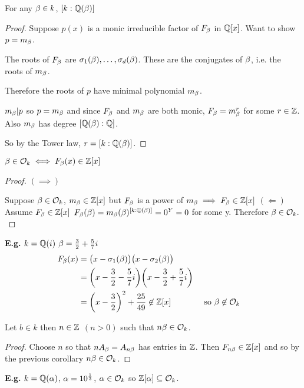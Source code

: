 \documentclass[11pt]{article}
\begin{document}
\begin{cor}
	For any $\beta \in k$, $[k : \mathbb{Q}(\beta)]$
\end{cor}
\begin{proof}
	Suppose $p(x)$ is a monic irreducible factor of $F_\beta$ in $\mathbb{Q}[x]$.
	Want to show $p=m_\beta$.
	\spa

	The roots of $F_\beta$ are $\sigma_1(\beta), \dots, \sigma_d(\beta)$.
	These are the conjugates of $\beta$, i.e. the roots of $m_\beta$.
	\spa

	Therefore the roots of $p$ have minimal polynomial $m_\beta$.
	\spa

	$m_\beta | p$ so $p = m_\beta$ and since $F_\beta $ and $m_\beta$ are both monic, $F_\beta = m_\beta^r$ for some $r \in \mathbb{Z}$.
	Also $m_\beta$ has degree $[\mathbb{Q}(\beta) : \mathbb{Q}]$.
\spa

	So by the Tower law, $r = [k: \mathbb{Q}(\beta)]$.
\end{proof}
\begin{cor}
	$\beta \in \mathcal{O}_{k} \iff F_\beta(x) \in \mathbb{Z}[x]$
\end{cor}
\begin{proof}
	$(\implies)$
\spa

	Suppose $\beta \in \mathcal{O}_k $, $m_\beta \in \mathbb{Z}[x]$ but $F_\beta $ is a power of $m_\beta \implies F_\beta \in \mathbb{Z}[x]$
\spac
	$(\Longleftarrow)$
	Assume $F_\beta \in \mathbb{Z}[x] $ \hspace{7pt} $ F_\beta(\beta) = m_\beta(\beta)^{[k:\mathbb{Q}(\beta)]} = 0^{Y} = 0$ for some y.
	Therefore $\beta \in \mathcal{O}_k.$
	
\end{proof}

\textbf{E.g.} $k = \mathbb{Q}(i) $\hspace{7pt} $ \beta = \frac{3}{2} + \frac{5}{7}i$
\begin{align*}
	F_\beta(x) &= \big(x-\sigma_1(\beta)\big)\big(x-\sigma_2(\beta)\big)\\
	& = \bigg(x- \frac{3}{2} - \frac{5}{7} i\bigg)\bigg(x-\frac{3}{2} + \frac{5}{7}i\bigg)\\
	& = \bigg(x-\frac{3}{2}\bigg)^2 + \frac{25}{49} \not \in \mathbb{Z}[x] && \text{ so } \beta \not \in \mathcal{O}_k
\end{align*}

\begin{cor}
	Let $b \in k$ then $n \in \mathbb{Z}$ $(n > 0)$ such that $n \beta \in \mathcal{O}_k$.
\end{cor}

\begin{proof}
	Choose $n$ so that $nA_\beta = A_{n\beta}$ has entries in $\mathbb{Z}$. 
	Then $F_{n\beta} \in \mathbb{Z}[x]$ and so by the previous corollary $n\beta \in \mathcal{O}_k$. 
\end{proof}
\spa
\textbf{E.g.} $k = \mathbb{Q}(\alpha)$, $\alpha = 10^{\frac{1}{3}}$,\hspace{7pt}  $\alpha \in \mathcal{O}_k$ so $\mathbb{Z}[\alpha] \subseteq \mathcal{O}_k$.
\spa
\end{document}
